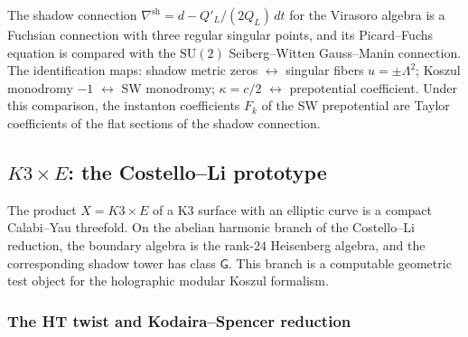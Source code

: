 \begin{remark}
\label{rem:holographic-sw}
The shadow connection
$\nabla^{\mathrm{sh}} = d - Q'_L/(2Q_L)\,dt$
for the Virasoro algebra is a Fuchsian connection
with three regular singular points, and its Picard--Fuchs
equation is compared with the $\mathrm{SU}(2)$ Seiberg--Witten
Gauss--Manin connection. The identification maps:
shadow metric zeros $\leftrightarrow$ singular fibers
$u = \pm\Lambda^2$;
Koszul monodromy $-1$ $\leftrightarrow$ SW monodromy;
$\kappa = c/2$ $\leftrightarrow$ prepotential coefficient.
Under this comparison, the instanton coefficients $F_k$ of the SW
prepotential are Taylor coefficients of the flat sections of the shadow
connection.
\end{remark}


%
%

\subsection{\texorpdfstring{$K3 \times E$}{K3 x E}: the Costello--Li prototype}
\label{subsec:k3e-holographic-datum}

The product $X = K3 \times E$ of a K3 surface with an elliptic curve
is a compact Calabi--Yau threefold. On the abelian harmonic branch of
the Costello--Li reduction, the boundary algebra is the rank-$24$
Heisenberg algebra, and the corresponding shadow tower has class
$\mathsf{G}$. This branch is a computable geometric test object for
the holographic modular Koszul formalism.

\subsubsection{The HT twist and Kodaira--Spencer reduction}
\label{subsubsec:k3e-ht-twist}

